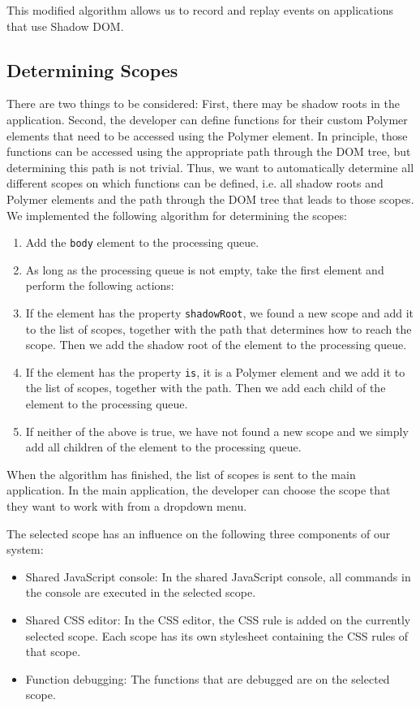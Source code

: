 This modified algorithm allows us to record and replay events on applications that use Shadow DOM. 

\subsection{Determining Scopes}

There are two things to be considered: First, there may be shadow roots in the application. Second, the developer can define functions for their custom Polymer elements that need to be accessed using the Polymer element. In principle, those functions can be accessed using the appropriate path through the DOM tree, but determining this path is not trivial. Thus, we want to automatically determine all different scopes on which functions can be defined, i.e. all shadow roots and Polymer elements and the path through the DOM tree that leads to those scopes. We implemented the following algorithm for determining the scopes:
\begin{enumerate}
	\item Add the \lstinline|body| element to the processing queue.
	\item As long as the processing queue is not empty, take the first element and perform the following actions:
		\item If the element has the property \lstinline|shadowRoot|, we found a new scope and add it to the list of scopes, together with the path that determines how to reach the scope. Then we add the shadow root of the element to the processing queue.
		\item If the element has the property \lstinline|is|, it is a Polymer element and we add it to the list of scopes, together with the path. Then we add each child of the element to the processing queue.
		\item If neither of the above is true, we have not found a new scope and we simply add all children of the element to the processing queue.
\end{enumerate}
When the algorithm has finished, the list of scopes is sent to the main application. In the main application, the developer can choose the scope that they want to work with from a dropdown menu.

The selected scope has an influence on the following three components of our system:
\begin{itemize}
	\item Shared JavaScript console: In the shared JavaScript console, all commands in the console are executed in the selected scope. 
	\item Shared CSS editor: In the CSS editor, the CSS rule is added on the currently selected scope. Each scope has its own stylesheet containing the CSS rules of that scope.
	\item Function debugging: The functions that are debugged are on the selected scope.
\end{itemize}